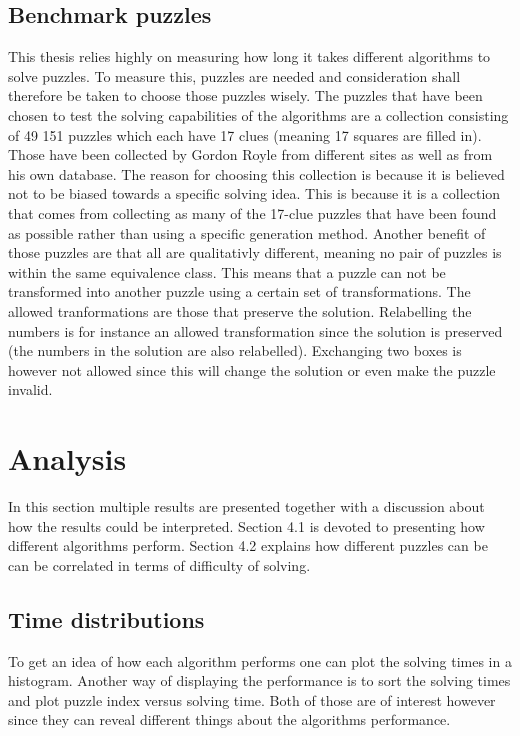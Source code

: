 \documentclass[a4paper,11pt]{kth-mag}
\begin{document}
\FloatBarrier
\section{Benchmark puzzles}
This thesis relies highly on measuring how long it takes different algorithms to solve puzzles. 
To measure this, puzzles are needed and consideration shall therefore be taken to choose those puzzles wisely.
The puzzles that have been chosen to test the solving capabilities of the algorithms are a collection consisting of 49 151 puzzles which each have 17 clues (meaning 17 squares are filled in). \cite{database} Those have been collected by Gordon Royle from different sites as well as from his own database.
The reason for choosing this collection is because it is believed not to be biased towards a specific solving idea.
This is because it is a collection that comes from collecting as many of the 17-clue puzzles that have been found as possible rather than using a specific generation method.
Another benefit of those puzzles are that all are qualitativly different, meaning no pair of puzzles is within the same equivalence class.
This means that a puzzle can not be transformed into another puzzle using a certain set of transformations.
The allowed tranformations are those that preserve the solution. Relabelling the numbers is for instance an allowed transformation since the solution is preserved (the numbers in the solution are also relabelled).
Exchanging two boxes is however not allowed since this will change the solution or even make the puzzle invalid.

\chapter{Analysis}
In this section multiple results are presented together with a discussion about how the results could be interpreted. 
Section 4.1 is devoted to presenting how different algorithms perform. 
Section 4.2 explains how different puzzles can be can be correlated in terms of difficulty of solving.

\FloatBarrier
\section{Time distributions}
To get an idea of how each algorithm performs one can plot the solving times in a histogram. Another way of displaying the performance is to sort the solving times and plot puzzle index versus solving time. Both of those are of interest however since they can reveal different things about the algorithms performance. 
\end{document}
